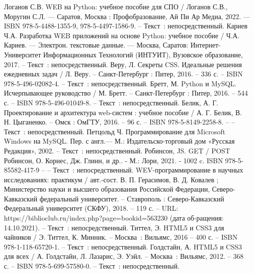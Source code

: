 
\begin{thebibliography}{9}

     Логанов С.В. WEB на Python: учебное пособие для СПО / Логанов С.В., Моругин С.Л. — Саратов, Москва : Профобразование, Ай Пи Ар Медиа, 2022. — ISBN 978-5-4488-1355-9, 978-5-4497-1586-9. – Текст~: непосредственный.
     Кариев Ч.А. Разработка WEB приложений на основе Python: учебное пособие / Ч.А. Кариев. — Электрон. текстовые данные. — Москва, Саратов: Интернет-Университет Информационных Технологий (ИНТУИТ), Вузовское образование, 2017. – Текст~: непосредственный.
     Веру, Л. Секреты CSS. Идеальные решения ежедневных задач / Л. Веру. – Санкт-Петербург : Питер, 2016. – 336 с. – ISBN 978-5-496-02082-4. – Текст~: непосредственный.
     Бретт, М. Python и MySQL. Исчерпывающее руководство / М. Бретт. – Санкт-Петербург : Питер, 2016. – 544 с. – ISBN 978-5-496-01049-8. – Текст~: непосредственный.
		Белик, А. Г. Проектирование и архитектура web-систем : учебное пособие / А. Г. Белик, В. Н. Цыганенко. – Омск : ОмГТУ, 2016. – 96 с. – ISBN 978-5-8149-2258-8. – – Текст~: непосредственный.
	 Петцольд Ч. Программирование для Microsoft Windows на MySQL. Пер. с англ.— М.: Издательско-торговый дом «Русская Редакция», 2002.  – Текст~: непосредственный.
	 Робинсон, JS. GET / POST Робинсон, О. Корнес, Дж. Глинн, и др.. - М.: Лори, 2021. - 1002 c. ISBN 978-5-85582-417-9 – – Текст~: непосредственный.
	 WEV-программирование в научных исследованиях: практикум / авт.-сост. В. П. Герасимов, В. Д. Ковалев ; Министерство науки и высшего образования Российской Федерации, Северо-Кавказский федеральный университет. – Ставрополь : Северо-Кавказский Федеральный университет (СКФУ), 2018. – 119 с. – URL: https://biblioclub.ru/index.php?page=bookid=563230 (дата об-ращения: 14.10.2021). – Текст~: непосредственный.
		Титтел, Э. HTML5 и CSS3 для чайников / Э. Титтел, К. Минник. – Москва~: Вильямс, 2016 – 400 с. – ISBN 978-1-118-65720-1. – Текст~: непосредственный.     
		Голдстайн, А. HTML5 и CSS3 для всех / А. Голдстайн, Л. Лазарис, Э. Уэйл. – Москва~: Вильямс, 2012. – 368 с. – ISBN 978-5-699-57580-0. – Текст~: непосредственный.
\end{thebibliography}
